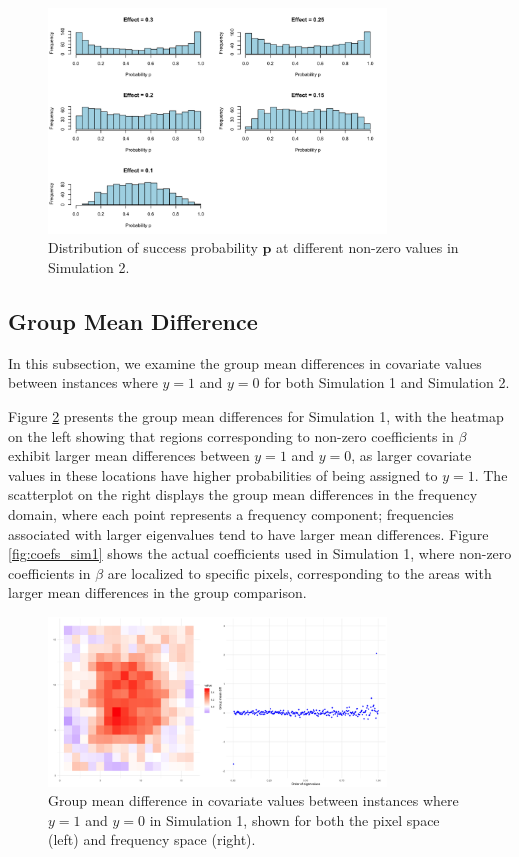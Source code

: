 \documentclass[12pt]{article}
\begin{document}
\begin{figure}[H]
	\centering
	\includegraphics[width=0.8\textwidth]{sim2_p_dist.png}
  \caption{Distribution of success probability \( \mathbf{p} \) at different non-zero values in Simulation 2.}
	\label{fig:sim2_p_dist}
\end{figure}

\FloatBarrier

\subsection*{Group Mean Difference}

In this subsection, we examine the group mean differences in covariate values between instances where \( y = 1 \) and \( y = 0 \) for both Simulation 1 and Simulation 2.

Figure \ref{fig:group_diff1} presents the group mean differences for Simulation 1, with the heatmap on the left showing that regions corresponding to non-zero coefficients in \( \beta \) exhibit larger mean differences between \( y = 1 \) and \( y = 0 \), as larger covariate values in these locations have higher probabilities of being assigned to \( y = 1 \). The scatterplot on the right displays the group mean differences in the frequency domain, where each point represents a frequency component; frequencies associated with larger eigenvalues tend to have larger mean differences. Figure \ref{fig:coefs_sim1} shows the actual coefficients used in Simulation 1, where non-zero coefficients in \( \beta \) are localized to specific pixels, corresponding to the areas with larger mean differences in the group comparison.

\begin{figure}[H]
	\centering
  \includegraphics[width=0.8\textwidth, height=0.35\textwidth]{group_mean_diff_sim1.png}
	\caption{Group mean difference in covariate values between instances where \( y = 1 \) and \( y = 0 \) in Simulation
		1, shown for both the pixel space (left) and frequency space (right).}
	\label{fig:group_diff1}
\end{figure}
\end{document}
